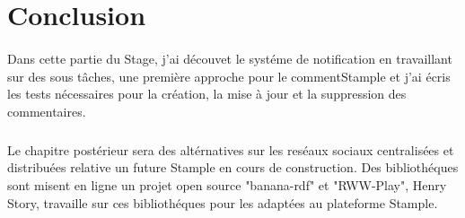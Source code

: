 \section{Conclusion}
\paragraph{}
Dans cette partie du Stage, j'ai découvet le systéme de notification en travaillant sur des sous tâches, une première approche pour le commentStample et j'ai écris les tests nécessaires pour la création, la mise à jour et la suppression des commentaires.
\subparagraph{}
Le chapitre postérieur sera des altérnatives sur les reséaux sociaux centralisées et distribuées relative un future Stample en cours de construction.
Des bibliothéques sont misent en ligne un projet open source "banana-rdf" et "RWW-Play", Henry Story, travaille sur ces bibliothéques pour les adaptées au plateforme Stample.
